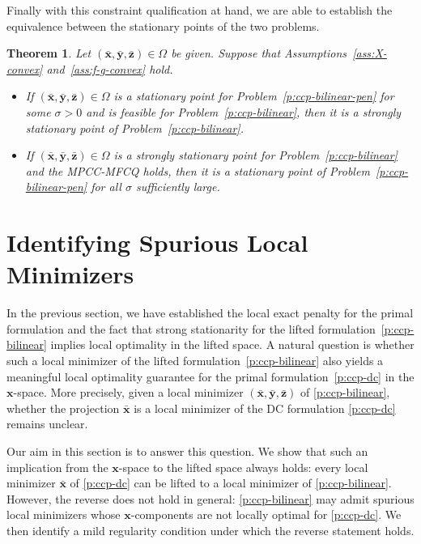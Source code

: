 \documentclass[11pt]{article}
\newtheorem{theorem}{Theorem}[section]
\def\bs{\boldsymbol}
\begin{document}
Finally with this constraint qualification at hand, we are able to establish the equivalence between the stationary points of the two problems.

\begin{theorem}{\cite[proposition 6]{jara2018study}}
Let $(\bar{\bs{x}}, \bar{\bs{y}}, \bar{\bs{z}})\in\Omega$ be given. Suppose that Assumptions~\ref{ass:X-convex} and~\ref{ass:f-g-convex} hold.
\begin{itemize}
\item[(a)] If $(\bar{\bs{x}}, \bar{\bs{y}}, \bar{\bs{z}})\in\Omega$ is a stationary point for Problem~\eqref{p:ccp-bilinear-pen} for some $\sigma > 0$ and is feasible for Problem~\eqref{p:ccp-bilinear}, then it is a strongly stationary point of Problem~\eqref{p:ccp-bilinear}.
\item[(b)] If $(\bar{\bs{x}}, \bar{\bs{y}}, \bar{\bs{z}})\in\Omega$ is a strongly stationary point for Problem~\eqref{p:ccp-bilinear} and the MPCC-MFCQ holds, then it is a stationary point of Problem~\eqref{p:ccp-bilinear-pen} for all $\sigma$ sufficiently large.
\end{itemize}
\end{theorem}

\section{Identifying Spurious Local Minimizers} \label{sec:iden-localmin}

In the previous section, we have established the local exact penalty for the primal formulation and the fact that strong stationarity for the lifted formulation~\eqref{p:ccp-bilinear} implies local optimality in the lifted space. A natural question is whether such a local minimizer of the lifted formulation~\eqref{p:ccp-bilinear} also yields a meaningful local optimality guarantee for the primal formulation~\eqref{p:ccp-dc} in the $\bs{x}$-space. More precisely, given a local minimizer $(\bar{\bs{x}},\bar{\bs{y}},\bar{\bs{z}})$ of \eqref{p:ccp-bilinear}, whether the projection $\bar{\bs{x}}$ is a local minimizer of the DC formulation \eqref{p:ccp-dc} remains unclear.

Our aim in this section is to answer this question. We show that such an implication from the $\bs{x}$-space to the lifted space always holds: every local minimizer
$\bar{\bs{x}}$ of \eqref{p:ccp-dc} can be lifted to a local minimizer of \eqref{p:ccp-bilinear}. However, the reverse does not hold in general: \eqref{p:ccp-bilinear} may admit spurious local minimizers whose $\bs{x}$-components are not locally optimal for \eqref{p:ccp-dc}. We then identify a mild regularity condition under which the reverse statement holds.
\end{document}
